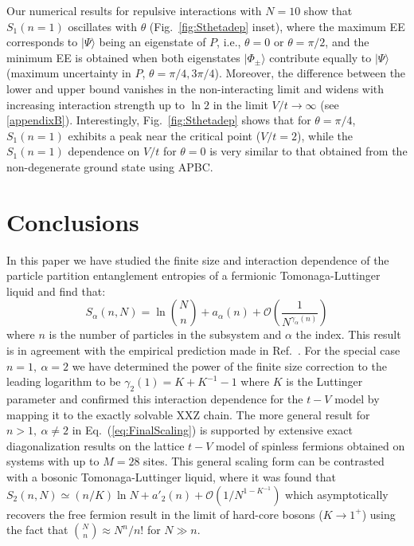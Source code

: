 %
Our numerical results for repulsive interactions with $N=10$ show that
$S_1(n=1)$ oscillates with $\theta$ (Fig.~\ref{fig:Sthetadep} inset), where the
maximum EE corresponds to $\vert \Psi\rangle$ being an eigenstate of $P$, i.e., $\theta=0$ or $\theta=\pi/2$, and the minimum EE is obtained when
both eigenstates $\vert\Phi_{\pm}\rangle$ contribute equally to $\vert
\Psi\rangle$ (maximum uncertainty in $P$, $\theta= \pi/4,3\pi/4$).  Moreover,
the difference between the lower and upper bound vanishes in the non-interacting limit and
widens with increasing interaction strength up to $\ln 2$ in the limit
$V/t\rightarrow \infty$ (see \ref{appendixB}). Interestingly, Fig.~\ref{fig:Sthetadep} shows
that for $\theta=\pi/4$, $S_1(n=1)$ exhibits a peak near the critical
point ($V/t=2$), while the $S_1(n=1)$  dependence on $V/t$ for $\theta=0$ is very
similar to that obtained from the non-degenerate ground state using APBC. 

%
\section{Conclusions}
%

In this paper we have studied the finite size and interaction
dependence of the particle partition \ren entanglement entropies of a fermionic
Tomonaga-Luttinger liquid and find that:
\begin{equation}
    S_\alpha(n,N) = \ln \binom{N}{n} + a_\alpha(n) +
    \mathcal{O}\left(\frac{1}{N^{\gamma_\alpha(n)}}\right)
\label{eq:FinalScaling}
\end{equation}
%
where $n$ is the number of particles in the subsystem and $\alpha$ the \ren
index.  This result is in agreement with the empirical prediction made in
Ref.~\cite{Zozulya:2007jw}.  For the special case $n=1,\ \alpha=2$ we have determined
the power of the finite size correction to the leading logarithm to be
$\gamma_2(1) = K + K^{-1} - 1$ where $K$ is the Luttinger parameter and
confirmed this interaction dependence for the $t-V$ model by mapping it to the
exactly solvable XXZ chain.  The more general result for $n>1,\ \alpha \ne 2$
in Eq.~(\ref{eq:FinalScaling}) is supported by extensive exact diagonalization
results on the lattice $t-V$ model of spinless fermions obtained on systems
with up to $M=28$ sites.  This general scaling form can be contrasted with a
bosonic Tomonaga-Luttinger liquid, where it was found \cite{Herdman:2015gx}
that $S_2(n,N) \simeq (n/K)\ln N + a'_2(n) + \mathcal{O}(1/N^{1-K^{-1}})$ which
asymptotically recovers the free fermion result in the limit of hard-core
bosons ($K\to 1^+$) using the fact that $\binom{N}{n} \approx N^n/n!$ for $N \gg
n$. 

